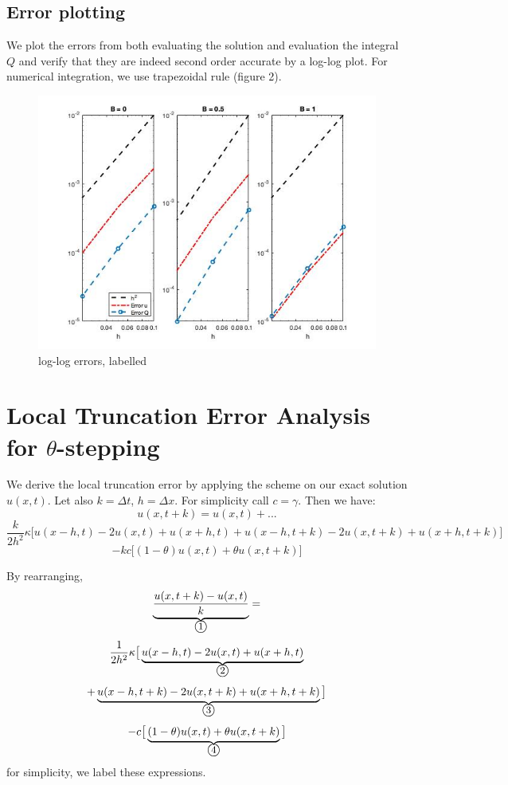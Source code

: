 \documentclass[12pt]{article}
\newcommand{\uno}{\large \textcircled{\small{1}}}
\newcommand{\dos}{\large\textcircled{\small{2}}}
\newcommand{\tres}{\large\textcircled{\small{3}}}
\newcommand{\yonn}{\large\textcircled{\small{4}}} %
\begin{document}
\subsection{Error plotting}
We plot the errors from both evaluating the solution and evaluation the integral $Q$ and verify that they are indeed second order accurate by a log-log plot. For numerical integration, we use trapezoidal rule (figure 2).
\begin{figure}[h]
	\centering
	\includegraphics[width=1\linewidth]{./errors.jpg}
	\caption{log-log errors, labelled}
\end{figure}




\section{Local Truncation Error Analysis for $\theta$-stepping}
We derive the local truncation error by applying the scheme on our exact solution $u(x,t)$. Let also $k = \Delta t$, $h = \Delta x$. For simplicity call $c = \gamma$.
\newcommand{\bk}{\kappa}
Then we have:
$$
	u(x,t+k) = u(x,t)+...
$$
$$
\frac{k}{2h^2}\bk
\big[
		u(x-h,t)-2u(x,t)+u(x+h,t) +
	u(x-h,t+k)-2u(x,t+k)+u(x+h,t+k)
	\big]
$$
$$
	-
	kc \big[
		(1-\theta)u(x,t)+\theta u(x,t+k)
	\big]
$$

By rearranging,
$$
	\underbrace{\frac{u(x,t+k) - u(x,t)}{k}}_\textrm{\uno} =
$$
$$
	\frac{1}{2h^2}\bk
\big[
		\underbrace{u(x-h,t)-2u(x,t)+u(x+h,t)}_\textrm{\dos} 
$$
$$
	+
	\underbrace{u(x-h,t+k)-2u(x,t+k)+u(x+h,t+k)}_\textrm{\tres}
	\big]
$$
$$
	-
	c \big[
		\underbrace{(1-\theta)u(x,t)+\theta u(x,t+k)}_\textrm{\yonn}
	\big]
$$ for simplicity, we label these expressions.
\end{document}
